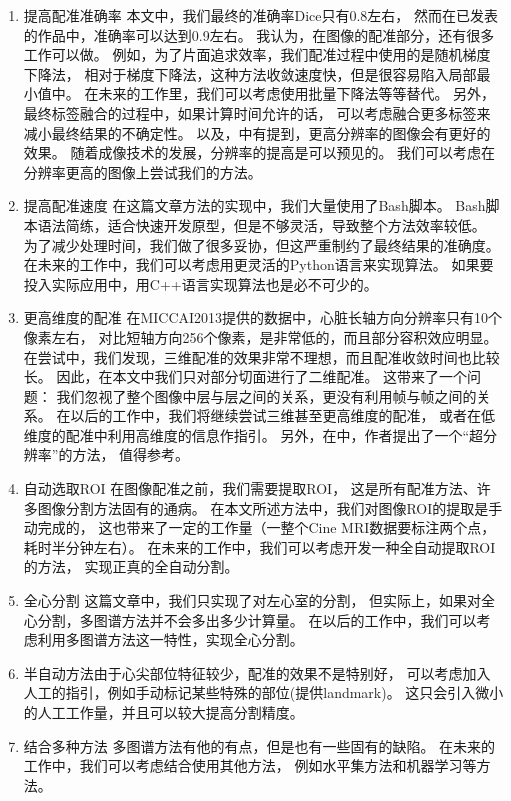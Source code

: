\begin{enumerate}
  \item{提高配准准确率}
    本文中，我们最终的准确率Dice只有0.8左右，
    然而在已发表的作品中，准确率可以达到0.9左右。
    我认为，在图像的配准部分，还有很多工作可以做。
    例如，为了片面追求效率，我们配准过程中使用的是随机梯度下降法，
    相对于梯度下降法，这种方法收敛速度快，但是很容易陷入局部最小值中。
    在未来的工作里，我们可以考虑使用批量下降法等等替代。
    另外，最终标签融合的过程中，如果计算时间允许的话，
    可以考虑融合更多标签来减小最终结果的不确定性。
    以及，\cite{HigherResolution}中有提到，更高分辨率的图像会有更好的效果。
    随着成像技术的发展，分辨率的提高是可以预见的。
    我们可以考虑在分辨率更高的图像上尝试我们的方法。
  \item{提高配准速度}
    在这篇文章方法的实现中，我们大量使用了Bash脚本。
    Bash脚本语法简练，适合快速开发原型，但是不够灵活，导致整个方法效率较低。
    为了减少处理时间，我们做了很多妥协，但这严重制约了最终结果的准确度。
    在未来的工作中，我们可以考虑用更灵活的Python语言来实现算法。
    如果要投入实际应用中，用C++语言实现算法也是必不可少的。
  \item{更高维度的配准}
    在MICCAI2013提供的数据中，心脏长轴方向分辨率只有10个像素左右，
    对比短轴方向256个像素，是非常低的，而且部分容积效应明显。
    在尝试中，我们发现，三维配准的效果非常不理想，而且配准收敛时间也比较长。
    因此，在本文中我们只对部分切面进行了二维配准。
    这带来了一个问题：
    我们忽视了整个图像中层与层之间的关系，更没有利用帧与帧之间的关系。
    在以后的工作中，我们将继续尝试三维甚至更高维度的配准，
    或者在低维度的配准中利用高维度的信息作指引。
    另外，在\cite{ShiSuperResolution2013}中，作者提出了一个``超分辨率''的方法，
    值得参考。
  \item{自动选取ROI}
    在图像配准之前，我们需要提取ROI，
    这是所有配准方法、许多图像分割方法固有的通病。
    在本文所述方法中，我们对图像ROI的提取是手动完成的，
    这也带来了一定的工作量（一整个Cine MRI数据要标注两个点，耗时半分钟左右）。
    在未来的工作中，我们可以考虑开发一种全自动提取ROI的方法，
    实现正真的全自动分割。
  \item{全心分割}
    这篇文章中，我们只实现了对左心室的分割，
    但实际上，如果对全心分割，多图谱方法并不会多出多少计算量。
    在以后的工作中，我们可以考虑利用多图谱方法这一特性，实现全心分割。
  \item{半自动方法}由于心尖部位特征较少，配准的效果不是特别好，
    可以考虑加入人工的指引，例如手动标记某些特殊的部位(提供landmark)。
    这只会引入微小的人工工作量，并且可以较大提高分割精度。
  \item{结合多种方法}
    多图谱方法有他的有点，但是也有一些固有的缺陷。
    在未来的工作中，我们可以考虑结合使用其他方法，
    例如水平集方法和机器学习等方法。
\end{enumerate}
